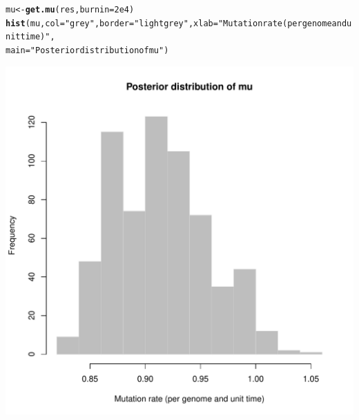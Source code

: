 \documentclass{article}\usepackage[]{graphicx}\usepackage[]{color}
\makeatletter
\newcommand{\hlnum}[1]{\textcolor[rgb]{0.686,0.059,0.569}{#1}}%
\newcommand{\hlstr}[1]{\textcolor[rgb]{0.192,0.494,0.8}{#1}}%
\newcommand{\hlstd}[1]{\textcolor[rgb]{0.345,0.345,0.345}{#1}}%
\newcommand{\hlkwb}[1]{\textcolor[rgb]{0.69,0.353,0.396}{#1}}%
\newcommand{\hlkwc}[1]{\textcolor[rgb]{0.333,0.667,0.333}{#1}}%
\newcommand{\hlkwd}[1]{\textcolor[rgb]{0.737,0.353,0.396}{\textbf{#1}}}%
\newenvironment{kframe}{%
 \def\at@end@of@kframe{}%
 \ifinner\ifhmode%
  \def\at@end@of@kframe{\end{minipage}}%
  \begin{minipage}{\columnwidth}%
 \fi\fi%
 \def\FrameCommand##1{\hskip\@totalleftmargin \hskip-\fboxsep
 \colorbox{shadecolor}{##1}\hskip-\fboxsep
     \hskip-\linewidth \hskip-\@totalleftmargin \hskip\columnwidth}%
 \MakeFramed {\advance\hsize-\width
   \@totalleftmargin\z@ \linewidth\hsize
   \@setminipage}}%
 {\par\unskip\endMakeFramed%
 \at@end@of@kframe}
\newenvironment{knitrout}{}{} %
\makeatother
\begin{document}
\begin{knitrout}
\color{fgcolor}\begin{kframe}
\begin{alltt}
\hlstd{mu} \hlkwb{<-} \hlkwd{get.mu}\hlstd{(res,} \hlkwc{burnin}\hlstd{=}\hlnum{2e4}\hlstd{)}
\hlkwd{hist}\hlstd{(mu,} \hlkwc{col}\hlstd{=}\hlstr{"grey"}\hlstd{,}\hlkwc{border}\hlstd{=}\hlstr{"lightgrey"}\hlstd{,} \hlkwc{xlab}\hlstd{=}\hlstr{"Mutation rate (per genome and unit time)"}\hlstd{,}
     \hlkwc{main}\hlstd{=}\hlstr{"Posterior distribution of mu"}\hlstd{)}
\end{alltt}
\end{kframe}

{\centering \includegraphics[width=.6\textwidth]{figs/unnamed-chunk-37} 

}



\end{knitrout}
\end{document}
